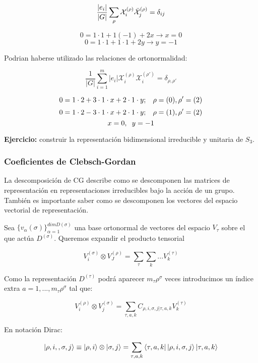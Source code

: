 \documentclass{article}
\begin{document}
\begin{itemize}
    $$\frac{|e_i|}{|G|}\sum _\rho \mathcal{X}_i^{(\rho)}\Bar{\mathcal{X}}_j^{(\rho)}=\delta _{ij}$$
    
    $$0=1\cdot 1+1(-1)+ 2x \to x=0$$
    $$0=1\cdot 1+1\cdot 1 +2y \to y=-1$$
    
    Podrian haberse utilizado las relaciones de ortonormalidad:
    
    $$\frac{1}{|G|}\sum _{i=1}^m |e_i|\mathcal{X}_i^{(\rho)}\mathcal{X}_i^{(\rho ')}=\delta _{\rho , \rho '}$$
    
    $$0=1\cdot 2+3\cdot 1\cdot x+2\cdot 1\cdot y; \hspace{0.3cm} \rho =(0), \rho '=(2)$$
    $$0=1\cdot 2-3\cdot 1\cdot x +2 \cdot 1\cdot y; \hspace{0.3cm} \rho =(1),\rho '=(2)$$
    $$x=0, \hspace{0.2cm} y=-1$$
    \end{itemize}
    
    \textbf{Ejercicio:} construir la representación bidimensional irreducible y unitaria de $S_3$.
    
    
    \newpage
    
    \subsubsection{Coeficientes de Clebsch-Gordan}
La descomposición de CG describe como se descomponen las matrices de representación en representaciones irreducibles bajo la acción de un grupo. También es importante saber como se descomponen los vectores del espacio vectorial de representación.

Sea $\lbrace v_\alpha (\sigma)\rbrace^{dim D(\sigma)}_{\alpha =1}$ una base ortonormal de vectores del espacio $V_\tau$ sobre el que actúa $D^{(\sigma)}$. Queremos expandir el producto tensorial

$$V_i^{(\sigma)}\otimes V_J^{(\rho)}=\sum _\tau \sum _k ...V_k^{(\tau)}$$

Como la representación $D^{(\tau)}$ podrá aparecer $m_\tau \rho ^\sigma$ veces introducimos un índice extra $a=1,..., m_\tau \rho ^\sigma$ tal que:

$$V_i^{(\rho)}\otimes V_j^{(\sigma)}=\sum _{\tau , a, k}C_{\rho , i, \sigma, j | \tau, a, k}V_k^{(\tau)}$$
    
En notación Dirac:

$$\ket{\rho, i, ,\sigma , j}\equiv \ket{\rho, i} \otimes \ket{\sigma , j}=\sum _{\tau , a,k}\bra{\tau , a, k}\ket{\rho, i,  \sigma ,j } \ket{\tau , a, k}$$
\end{document}
